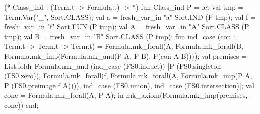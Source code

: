 \nwenddocs{}\plusendmoddef\nwstartdeflinemarkup{}\nwenddeflinemarkup
(* Class_ind : (Term.t -> Formula.t) ->  *)
fun Class_ind P =
  let
    val tmp = Term.Var("_", Sort.CLASS);
    val a = fresh_var_in "a" Sort.IND (P tmp);
    val f = fresh_var_in "f" Sort.FUN (P tmp);
    val A = fresh_var_in "A" Sort.CLASS (P tmp);
    val B = fresh_var_in "B" Sort.CLASS (P tmp);
    fun ind_case (con : Term.t -> Term.t -> Term.t) =
      Formula.mk_forall(A, Formula.mk_forall(B, Formula.mk_imp(Formula.mk_and(P A,
                                                                              P B),
                                                               P(con A B))));
    val premises =
      List.foldr Formula.mk_and
                 (ind_case (FS0.induct))
                 [P (FS0.singleton (FS0.zero)),
                  Formula.mk_forall(f, Formula.mk_forall(A, Formula.mk_imp(P A,
                                                                           P (FS0.preimage f A)))),
                  ind_case (FS0.union),
                  ind_case (FS0.intersection)];
    val conc = Formula.mk_forall(A, P A);
  in
    mk_axiom(Formula.mk_imp(premises, conc))
  end;
\eatline
